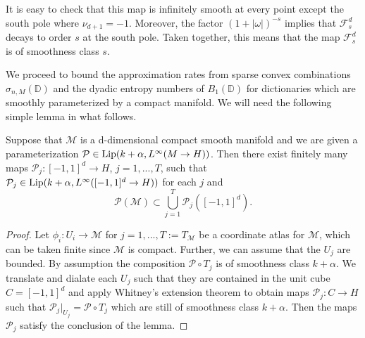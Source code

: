 It is easy to check that this map is infinitely smooth at every point except the south pole where $\nu_{d+1} = -1$. Moreover, the factor $\left(1 + |\omega|\right)^{-s}$ implies that $\mathcal{F}^d_s$ decays to order $s$ at the south pole. Taken together, this means that the map $\mathcal{F}^d_s$ is of smoothness class $s$.

We proceed to bound the approximation rates from sparse convex combinations $\sigma_{n,M}(\mathbb{D})$ and the dyadic entropy numbers of $B_1(\mathbb{D})$ for dictionaries which are smoothly parameterized by a compact manifold.
We will need the following simple lemma in what follows.
\begin{lemma}\label{image-of-union-of-cubes-lemma}
 Suppose that $\mathcal{M}$ is a d-dimensional compact smooth manifold and we are given a parameterization $\mathcal{P}\in {\rm Lip}(k+\alpha, L^\infty(M\rightarrow H))$. Then there exist finitely many maps $\mathcal{P}_j:[-1,1]^d\rightarrow H$, $j=1,...,T$, such that $\mathcal{P}_j\in {\rm Lip}(k+\alpha, L^\infty([-1,1]^d\rightarrow H))$ for each $j$ and
 \begin{equation}
  \mathcal{P}(\mathcal{M})\subset \bigcup_{j=1}^T \mathcal{P}_j([-1,1]^d).
 \end{equation}

\end{lemma}
\begin{proof}
 Let $\phi_i: U_i\rightarrow \mathcal{M}$ for $j=1,...,T:=T_{\mathcal{M}}$ be a coordinate atlas for $\mathcal{M}$, which can be taken finite since $\mathcal{M}$ is compact. Further, we can assume that the $U_j$ are bounded. By assumption the composition $\mathcal{P} \circ T_j$ is of smoothness class $k+\alpha$. We translate and dialate each $U_j$ such that they are contained in the unit cube $C = [-1,1]^d$ and apply Whitney's extension theorem \cite{whitney1934analytic} to obtain maps $\mathcal{P}_j:C\rightarrow H$ such that $\mathcal{P}_j|_{U_j} = \mathcal{P} \circ T_j$ which are still of smoothness class $k+\alpha$. Then the maps $\mathcal{P}_j$ satisfy the conclusion of the lemma.
\end{proof}

